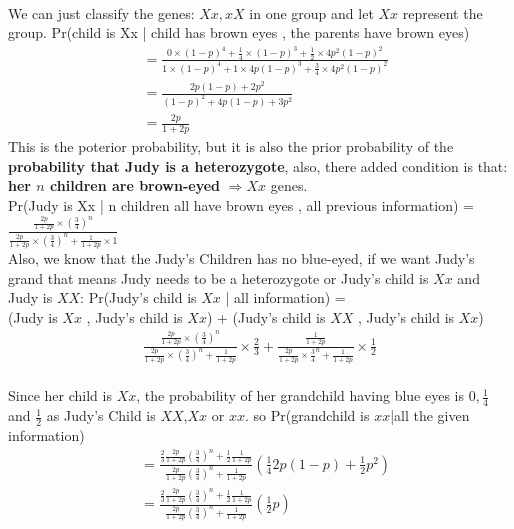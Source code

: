 \documentclass[11pt]{article}
\begin{document}
  \paragraph{\color{red}{Question Three Answer:}}
  We can just classify the genes: $Xx,xX$ in one group and let $Xx$ represent the group.
  Pr(child is Xx | child has brown eyes , the parents have brown eyes) \\
  \begin{align*}
    &= \frac{0 \times (1-p)^4 + \frac{1}{4}\times (1-p)^3 + \frac{1}{2}\times 4p^2(1-p)^2}{1\times(1-p)^4 + 1\times4p(1-p)^3 + \frac{3}{4}\times 4p^2(1-p)^2} \\
    &= \frac{2p(1-p) + 2p^2}{(1-p)^2 + 4p(1-p) + 3p^2} \\
    &= \frac{2p}{1+2p}
  \end{align*}
  This is the poterior probability, but it is also the prior probability of the \textbf{probability that Judy is a heterozygote}, also, there added condition is that: \textbf{her $n$ children are brown-eyed} $\Rightarrow Xx$ genes. \\
  Pr(Judy is Xx | n children all have brown eyes , all previous information) = $\frac{\frac{2p}{1+2p}\times (\frac{3}{4})^n}{\frac{2p}{1+2p}\times(\frac{3}{4})^n + \frac{1}{1+2p} \times 1}$ \\
  Also, we know that the Judy's Children has no blue-eyed, if we want Judy's grand that means Judy needs to  be a heterozygote or Judy's child is $Xx$ and Judy is $XX$:
  Pr(Judy’s child is $Xx$ | all information) = \\
  (Judy is $Xx$ , Judy's child is $Xx$) + (Judy’s child is $XX$ , Judy's child is $Xx$)
  \begin{align*}
    \frac{\frac{2p}{1+2p}\times (\frac{3}{4})^n}{\frac{2p}{1+2p}\times(\frac{3}{4})^n + \frac{1}{1+2p} } \times \frac{2}{3} + \frac{\frac{1}{1+2p}}{\frac{2p}{1+2p}\times\frac{3}{4}^n + \frac{1}{1+2p}}\times \frac{1}{2}
  \end{align*}\\
  Since her child is $Xx$, the probability of her grandchild having blue eyes is $0,\frac{1}{4}$ and $\frac{1}{2}$ as Judy's Child is $XX$,$Xx$ or $xx$. so Pr(grandchild is $xx$|all the given information) \\
  \begin{align*}
    &= \frac{\frac{2}{3}\frac{2p}{1+2p}(\frac{3}{4})^n + \frac{1}{2}\frac{1}{1+2p}}{\frac{2p}{1+2p}(\frac{3}{4})^n+ \frac{1}{1+2p}} (\frac{1}{4}2p(1-p) + \frac{1}{2}p^2) \\
    &= \frac{\frac{2}{3}\frac{2p}{1+2p}(\frac{3}{4})^n + \frac{1}{2}\frac{1}{1+2p}}{\frac{2p}{1+2p}(\frac{3}{4})^n+ \frac{1}{1+2p}} (\frac{1}{2}p)
  \end{align*}
\end{document}

